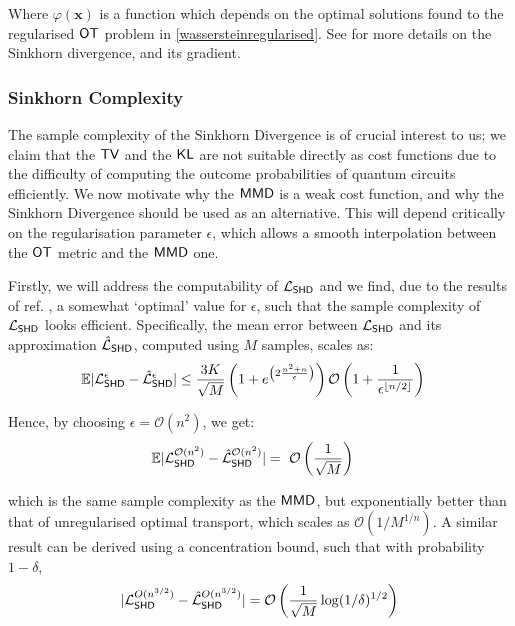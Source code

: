 Where $\varphi(\mathbf{x})$ is a function which depends on the optimal solutions found to the regularised $\operatorname{\textsf{OT}}$ problem in \eqref{wassersteinregularised}. See  for more details on the Sinkhorn divergence, and its gradient.

\subsubsection*{Sinkhorn Complexity}
The sample complexity of the Sinkhorn Divergence is of crucial interest to us; we claim that the $\operatorname{\textsf{TV}}$ and the $\operatorname{\textsf{KL}}$ are not suitable directly as cost functions due to the difficulty of computing the outcome probabilities of quantum circuits efficiently. We now motivate why the $\operatorname{\textsf{MMD}}$ is a weak cost function, and why the Sinkhorn Divergence should be used as an alternative. This will depend critically on the regularisation parameter $\epsilon$, which allows a smooth interpolation between the $\operatorname{\textsf{OT}}$ metric and the $\operatorname{\textsf{MMD}}$ one. 

Firstly, we will address the computability of $\mathcal{L}_{\operatorname{\textsf{SHD}}}$ and we find, due to the results of ref. \cite{genevay_sample_2018}, a somewhat `optimal' value for $\epsilon$, such that the sample complexity of $\mathcal{L}_{\operatorname{\textsf{SHD}}}$ looks efficient. Specifically, the mean error between $\mathcal{L}_{\operatorname{\textsf{SHD}}}$ and its approximation $\hat{\mathcal{L}}_{\operatorname{\textsf{SHD}}}$, computed using $M$ samples, scales as:
\begin{align}
     &\mathbb{E}|\mathcal{L}_{\operatorname{\textsf{SHD}}}^\epsilon - \hat{\mathcal{L}}_{\operatorname{\textsf{SHD}}}^\epsilon| \leq \frac{3K}{\sqrt{M}}\left(1+e^{\left(2\frac{n^2+n}{\epsilon}\right)}\right)\mathcal{O}\left(1+\frac{1}{\epsilon^{\lfloor n/2\rfloor}}\right)
\end{align}

\noindent Hence, by choosing $\epsilon = \mathcal{O}(n^{2})$, we get:
\begin{align}
     &\mathbb{E}|\mathcal{L}_{\operatorname{\textsf{SHD}}}^{\mathcal{O}(n^{2})} - \hat{\mathcal{L}}_{\operatorname{\textsf{SHD}}}^{ \mathcal{O}(n^{2})}| =~ \mathcal{O}\left(\frac{1}{\sqrt{M}}\right) \label{sinkhorn_expectation_sample_chosen_MAIN}
\end{align}

\noindent which is the same sample complexity as the $\operatorname{\textsf{MMD}}$\cite{sriperumbudur_integral_2009}, but exponentially better than that of unregularised optimal transport, which scales as $\mathcal{O}\left(1/{M}^{1/n}\right)$\cite{dudley_speed_1969}. A similar result can be derived using a concentration bound\cite{genevay_sample_2018}, such that with probability $1-\delta$, 
\begin{align}
    |\mathcal{L}_{\operatorname{\textsf{SHD}}}^{O(n^{3/2})}  - \hat{\mathcal{L}}_{\operatorname{\textsf{SHD}}}^{O(n^{3/2})} | 
    = \mathcal{O}\left(\frac{1}{\sqrt{M}}\log(1/\delta)^{1/2}\right) \label{sinkhornborn_samplecomplexity_choosed_MAIN}
\end{align}

